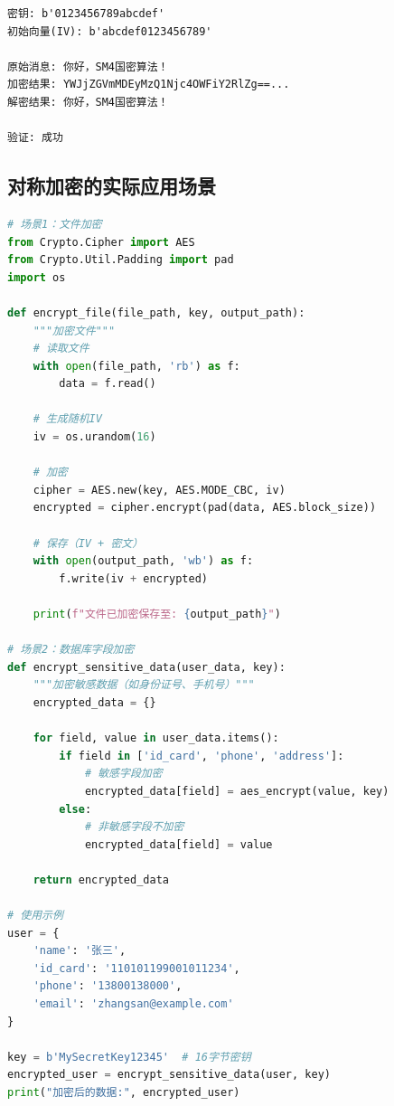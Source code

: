 \documentclass[12pt,a4paper]{article}
\begin{document}
\begin{notebox}[运行结果]
\begin{verbatim}
密钥: b'0123456789abcdef'
初始向量(IV): b'abcdef0123456789'

原始消息: 你好，SM4国密算法！
加密结果: YWJjZGVmMDEyMzQ1Njc4OWFiY2RlZg==...
解密结果: 你好，SM4国密算法！

验证: 成功
\end{verbatim}
\end{notebox}

\subsection{对称加密的实际应用场景}

\begin{lstlisting}[language=Python]
# 场景1：文件加密
from Crypto.Cipher import AES
from Crypto.Util.Padding import pad
import os

def encrypt_file(file_path, key, output_path):
    """加密文件"""
    # 读取文件
    with open(file_path, 'rb') as f:
        data = f.read()
    
    # 生成随机IV
    iv = os.urandom(16)
    
    # 加密
    cipher = AES.new(key, AES.MODE_CBC, iv)
    encrypted = cipher.encrypt(pad(data, AES.block_size))
    
    # 保存（IV + 密文）
    with open(output_path, 'wb') as f:
        f.write(iv + encrypted)
    
    print(f"文件已加密保存至: {output_path}")

# 场景2：数据库字段加密
def encrypt_sensitive_data(user_data, key):
    """加密敏感数据（如身份证号、手机号）"""
    encrypted_data = {}
    
    for field, value in user_data.items():
        if field in ['id_card', 'phone', 'address']:
            # 敏感字段加密
            encrypted_data[field] = aes_encrypt(value, key)
        else:
            # 非敏感字段不加密
            encrypted_data[field] = value
    
    return encrypted_data

# 使用示例
user = {
    'name': '张三',
    'id_card': '110101199001011234',
    'phone': '13800138000',
    'email': 'zhangsan@example.com'
}

key = b'MySecretKey12345'  # 16字节密钥
encrypted_user = encrypt_sensitive_data(user, key)
print("加密后的数据:", encrypted_user)
\end{lstlisting}
\end{document}
